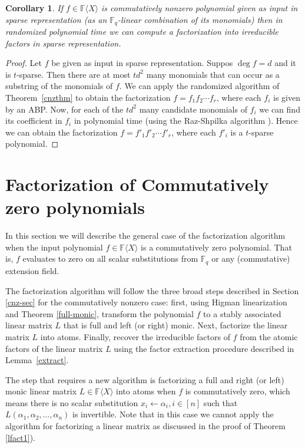 \documentclass[10pt,a4paper]{article}
\newtheorem{corollary}[theorem]{Corollary}
\newcommand{\F}{\mathbb{F}}
\renewcommand{\angle}[1]{\langle #1 \rangle}
\newcommand{\FX}{\F\angle{X}}
\newcommand{\fR}{\FX}
\begin{document}
\begin{corollary}\label{sparse-cor1}
If $f\in\fR$ is commutatively nonzero polynomial given as input in
sparse representation (as an $\F_q$-linear combination of its
monomials) then in randomized polynomial time we can compute
a factorization into irreducible factors in sparse representation.
\end{corollary}

\begin{proof}
  Let $f$ be given as input in sparse representation. Suppos $\deg f =
  d$ and it is $t$-sparse. Then there are at most $td^2$ many
  monomials that can occur as a substring of the monomials of $f$.  We
  can apply the randomized algorithm of Theorem~\ref{cnzthm} to obtain
  the factorization $f=f_1f_2\cdots f_r$, where each $f_i$ is given by
  an ABP. Now, for each of the $td^2$ many candidate monomials of
  $f_i$ we can find its coefficient in $f_i$ in polynomial time (using
  the Raz-Shpilka algorithm \cite{RS05}). Hence we can obtain the
  factorization $f=f'_1f'_2\cdots f'_r$, where each $f'_i$ is a
  $t$-sparse polynomial.
\end{proof}

%
\section{Factorization of Commutatively zero polynomials}\label{cz-sec}

In this section we will describe the general case of the factorization
algorithm when the input polynomial $f\in\fR$ is a commutatively zero
polynomial. That is, $f$ evaluates to zero on all scalar substitutions
from $\F_q$ or any (commutative) extension field.

%
%
%

The factorization algorithm will follow the three broad steps
described in Section \ref{cnz-sec} for the commutatively nonzero case:
first, using Higman linearization and Theorem \ref{full-monic},
transform the polynomial $f$ to a stably associated linear matrix $L$
that is full and left (or right) monic. Next, factorize the linear
matrix $L$ into atoms. Finally, recover the irreducible factors of $f$
from the atomic factors of the linear matrix $L$ using the factor
extraction procedure described in Lemma~\ref{extract}.

The step that requires a new algorithm is factorizing a full and right (or left)
monic linear matrix $L\in\fR$ into atoms when $f$ is commutatively
zero, which means there is no scalar substitution $x_i\leftarrow
\alpha_i, i\in[n]$ such that $L(\alpha_1,\alpha_2,\ldots,\alpha_n)$ is
invertible. Note that in this case we cannot apply the algorithm for
factorizing a linear matrix as discussed in the proof of Theorem
\ref{lfact1}).
\end{document}
